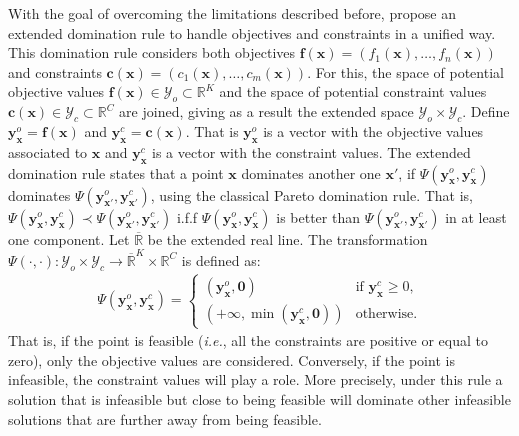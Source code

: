 \documentclass[review,preprint,12pt]{elsarticle}
\begin{document}
With the goal of overcoming the limitations described before, \cite{feliot2015bayesian}
propose an extended domination rule to handle objectives and constraints in a unified way.
This domination rule considers both objectives $\mathbf{f}(\mathbf{x}) = (f_1(\mathbf{x}),\ldots,f_n(\mathbf{x}))$ and 
constraints $\mathbf{c}(\mathbf{x}) = (c_1(\mathbf{x}),\ldots,c_m(\mathbf{x}))$.
For this, the space of potential objective values $\mathbf{f}(\mathbf{x}) \in \mathcal{Y}_o\subset \mathds{R}^K$ and the space of 
potential constraint values $\mathbf{c}(\mathbf{x}) \in \mathcal{Y}_c \subset \mathds{R}^C$ are joined, giving as a result
the extended space $\mathcal{Y}_o \times \mathcal{Y}_c$. 
Define $\mathbf{y}_\mathbf{x}^o=\mathbf{f}(\mathbf{x})$ and 
$\mathbf{y}_\mathbf{x}^c=\mathbf{c}(\mathbf{x})$. That is $\mathbf{y}^o_\mathbf{x}$ is a vector with the objective values associated to 
$\mathbf{x}$ and $\mathbf{y}^c_\mathbf{x}$ is a vector with the constraint values.
The extended domination rule states that a point $\mathbf{x}$ dominates another one $\mathbf{x}'$,
if $\Psi(\mathbf{y}_\mathbf{x}^o,\mathbf{y}_\mathbf{x}^c)$ dominates $\Psi(\mathbf{y}^o_{\mathbf{x}'}, 
\mathbf{y}^c_{\mathbf{x}'})$, using the classical 
Pareto domination rule. That is, $\Psi(\mathbf{y}_\mathbf{x}^o, \mathbf{y}_\mathbf{x}^c) 
\prec \Psi(\mathbf{y}^o_{\mathbf{x}'}, \mathbf{y}^c_{\mathbf{x}'})$ 
i.f.f $\Psi(\mathbf{y}_\mathbf{x}^o,\mathbf{y}_\mathbf{x}^c)$ is better than $\Psi(\mathbf{y}^o_{\mathbf{x}'}, 
\mathbf{y}^c_{\mathbf{x}'})$ in at least one component. 
Let $\overline{\mathds{R}}$ be the extended real line.
The transformation $\Psi(\cdot, \cdot): \mathcal{Y}_o \times \mathcal{Y}_c \rightarrow \overline{\mathds{R}}^K\times \mathds{R}^C$
is defined as:
\begin{align}
\Psi(\mathbf{y}^o_\mathbf{x},\mathbf{y}^c_\mathbf{x}) = \left\{ \begin{array}{ll}
(\mathbf{y}^o_\mathbf{x},\mathbf{0}) & \mbox{if $\mathbf{y}^c_\mathbf{x} \geq 0$},\\
(+\infty, \min{(\mathbf{y}^c_\mathbf{x},\mathbf{0})}) & \mbox{otherwise.}
\end{array}
\right.
\end{align}
That is, if the point is feasible (\emph{i.e.}, all the constraints are positive or equal to zero), only the objective
values are considered. Conversely, if the point is infeasible, the constraint values will play a role.
More precisely, under this rule a solution that is infeasible but close to being feasible will dominate 
other infeasible solutions that are further away from being feasible.
\end{document}
